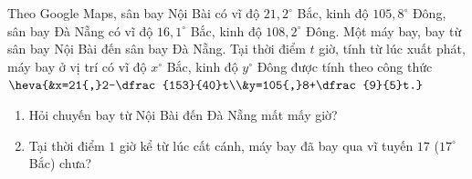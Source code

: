 \begin{bt}%
	Theo Google Maps, sân bay Nội Bài có vĩ độ $21{,}2^\circ$ Bắc, kinh độ $105{,}8^\circ$ Đông, sân bay Đà Nẵng có vĩ độ $16{,}1^\circ$ Bắc, kinh độ $108{,}2^\circ$ Đông. Một máy bay, bay từ sân bay Nội Bài đến sân bay Đà Nẵng. Tại thời điểm $t$ giờ, tính từ lúc xuất phát, máy bay ở vị trí có vĩ độ $x^\circ$ Bắc, kinh độ $y^\circ$ Đông được tính theo công thức $\heva{&x=21{,}2-\dfrac{153}{40}t\\&y=105{,}8+\dfrac{9}{5}t.}$
	\begin{enumerate}
		\item Hỏi chuyến bay từ Nội Bài đến Đà Nẵng mất mấy giờ?
		\item Tại thời điểm $1$ giờ kể từ lúc cất cánh, máy bay đã bay qua vĩ tuyến $17$ ($17^\circ$ Bắc) chưa?
	\end{enumerate}
\end{bt}

